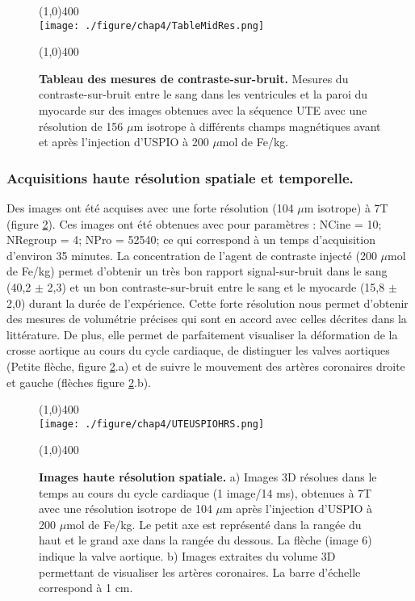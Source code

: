 \begin{figure}[H]
\centering
\line(1,0){400} \\
\texttt{[image: ./figure/chap4/TableMidRes.png]}
\caption[Tableau des mesures de contraste-sur-bruit.]{\label{fig:TableMidRes} \textbf{Tableau des mesures de contraste-sur-bruit.} Mesures du contraste-sur-bruit entre le sang dans les ventricules et la paroi du myocarde sur des images obtenues avec la séquence UTE avec une résolution de 156 $\mu$m isotrope à différents champs magnétiques avant et après l'injection d'USPIO à 200 $\mu$mol de Fe/kg.}
\line(1,0){400} \\ 
\end{figure}

\subsubsection{Acquisitions haute résolution spatiale et temporelle.}

Des images ont été acquises avec une forte résolution (104 $\mu$m isotrope) à 7T (figure \ref{fig:UTEUSPIOHRS}). Ces images ont été obtenues avec pour paramètres : NCine = 10; NRegroup = 4; NPro = 52540; ce qui correspond à un temps d'acquisition d'environ 35 minutes.
La concentration de l'agent de contraste injecté (200 $\mu$mol de Fe/kg) permet d'obtenir un très bon rapport signal-sur-bruit dans le sang (40,2 $\pm$ 2,3) et un bon contraste-sur-bruit entre le sang et le myocarde (15,8 $\pm$ 2,0) durant la durée de l'expérience.
Cette forte résolution nous permet d'obtenir des mesures de volumétrie précises qui sont en accord avec celles décrites dans la littérature. De plus, elle permet de parfaitement visualiser la déformation de la crosse aortique au cours du cycle cardiaque, de distinguer les valves aortiques (Petite flèche, figure \ref{fig:UTEUSPIOHRS}.a) et de suivre le mouvement des artères coronaires droite et gauche (flèches figure \ref{fig:UTEUSPIOHRS}.b).

\begin{figure}[H]
\centering
\line(1,0){400} \\
\texttt{[image: ./figure/chap4/UTEUSPIOHRS.png]}
\caption[Images haute résolution spatiale.]{\label{fig:UTEUSPIOHRS} \textbf{Images haute résolution spatiale.} a) Images 3D résolues dans le temps au cours du cycle cardiaque (1 image/14 ms), obtenues à 7T avec une résolution isotrope de 104 $\mu$m après l'injection d'USPIO à 200 $\mu$mol de Fe/kg. Le petit axe est représenté dans la rangée du haut et le grand axe dans la rangée du dessous. La flèche (image 6) indique la valve aortique. b) Images extraites du volume 3D permettant de visualiser les artères coronaires. La barre d'échelle correspond à 1 cm.}
\line(1,0){400} \\ 
\end{figure}

